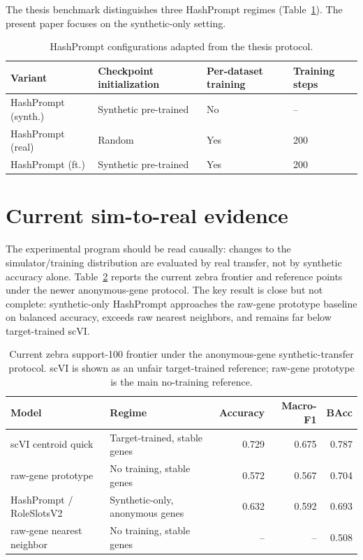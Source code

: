 \documentclass{article}
\begin{document}
The thesis benchmark distinguishes three HashPrompt regimes (Table~\ref{tab:hashprompt_variants}). The present paper focuses on the synthetic-only setting.

\begin{table}[t]
\centering
\small
\caption{HashPrompt configurations adapted from the thesis protocol.}
\label{tab:hashprompt_variants}
\begin{tabular}{@{}llll@{}}
\toprule
\textbf{Variant} & \textbf{Checkpoint initialization} & \textbf{Per-dataset training} & \textbf{Training steps} \\
\midrule
HashPrompt (synth.) & Synthetic pre-trained & No & -- \\
HashPrompt (real) & Random & Yes & 200 \\
HashPrompt (ft.) & Synthetic pre-trained & Yes & 200 \\
\bottomrule
\end{tabular}
\end{table}

\section{Current sim-to-real evidence}

The experimental program should be read causally: changes to the simulator/training distribution are evaluated by real transfer, not by synthetic accuracy alone. Table~\ref{tab:current_frontier} reports the current zebra frontier and reference points under the newer anonymous-gene protocol. The key result is close but not complete: synthetic-only HashPrompt approaches the raw-gene prototype baseline on balanced accuracy, exceeds raw nearest neighbors, and remains far below target-trained scVI.

\begin{table}[t]
\centering
\small
\caption{Current zebra support-100 frontier under the anonymous-gene synthetic-transfer protocol. scVI is shown as an unfair target-trained reference; raw-gene prototype is the main no-training reference.}
\label{tab:current_frontier}
\begin{tabular}{@{}llrrr@{}}
\toprule
\textbf{Model} & \textbf{Regime} & \textbf{Accuracy} & \textbf{Macro-F1} & \textbf{BAcc} \\
\midrule
scVI centroid quick & Target-trained, stable genes & 0.729 & 0.675 & 0.787 \\
raw-gene prototype & No training, stable genes & 0.572 & 0.567 & 0.704 \\
HashPrompt / RoleSlotsV2 & Synthetic-only, anonymous genes & 0.632 & 0.592 & 0.693 \\
raw-gene nearest neighbor & No training, stable genes & -- & -- & 0.508 \\
\bottomrule
\end{tabular}
\end{table}
\end{document}
